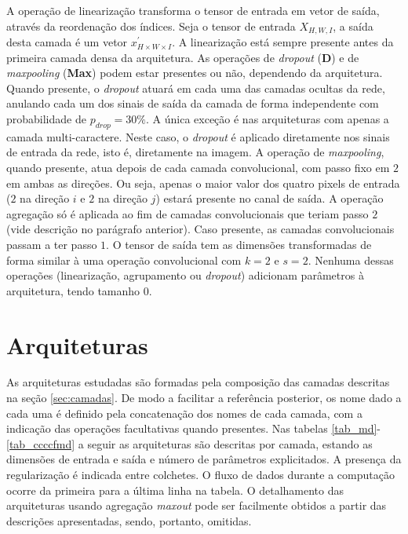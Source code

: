 A operação de linearização transforma o tensor de entrada em vetor de saída, através da reordenação dos índices. Seja o tensor de entrada $X_{H, W, I}$, a saída desta camada é um vetor $x^{'}_{H \times W \times I}$. A linearização está sempre presente antes da primeira camada densa da arquitetura. As operações de \textit{dropout} (\textbf{D}) e de \textit{maxpooling} (\textbf{Max}) podem estar presentes ou não, dependendo da arquitetura. Quando presente, o \textit{dropout} atuará em cada uma das camadas ocultas da rede, anulando cada um dos sinais de saída da camada de forma independente com probabilidade de $p_{drop} = 30\%$. A única exceção é nas arquiteturas com apenas a camada multi-caractere. Neste caso, o \textit{dropout} é aplicado diretamente nos sinais de entrada da rede, isto é, diretamente na imagem. A operação de \textit{maxpooling}, quando presente, atua depois de cada camada convolucional, com passo fixo em $2$ em ambas as direções. Ou seja, apenas o maior valor dos quatro pixels de entrada ($2$ na direção $i$ e $2$ na direção $j$) estará presente no canal de saída. A operação agregação só é aplicada ao fim de camadas convolucionais que teriam passo $2$ (vide descrição no parágrafo anterior). Caso presente, as camadas convolucionais passam a ter passo $1$. O tensor de saída tem as dimensões transformadas de forma similar à uma operação convolucional com $k = 2$ e $s = 2$. Nenhuma dessas operações (linearização, agrupamento ou \textit{dropout}) adicionam parâmetros à arquitetura, tendo tamanho $0$.

\section{Arquiteturas}

As arquiteturas estudadas são formadas pela composição das camadas descritas na seção \ref{sec:camadas}. De modo a facilitar a referência posterior, os nome dado a cada uma é definido pela concatenação dos nomes de cada camada, com a indicação das operações facultativas quando presentes. Nas tabelas \ref{tab_md}-\ref{tab_ccccfmd} a seguir as arquiteturas são descritas por camada, estando as dimensões de entrada e saída e número de parâmetros explicitados. A presença da regularização é indicada entre colchetes. O fluxo de dados durante a computação ocorre da primeira para a última linha na tabela. O detalhamento das arquiteturas usando agregação \textit{maxout} pode ser facilmente obtidos a partir das descrições apresentadas, sendo, portanto, omitidas.

